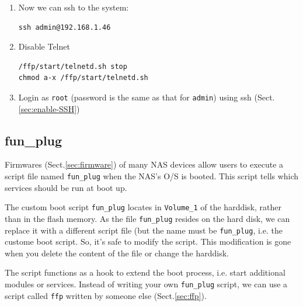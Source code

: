 \begin{enumerate}
 \item Now we can ssh to the system:
\begin{verbatim}
ssh admin@192.168.1.46
\end{verbatim}  
   
  \item Disable Telnet
\begin{verbatim}
/ffp/start/telnetd.sh stop
chmod a-x /ffp/start/telnetd.sh 
\end{verbatim}

  \item Login as \verb!root! (password is the same as that for \verb!admin!)
  using ssh (Sect.\ref{sec:enable-SSH})
  
\end{enumerate}


\subsection{fun\_plug}
\label{sec:fun_plug}

Firmwares (Sect.\ref{sec:firmware}) of many NAS devices allow users to execute a
script file named \verb!fun_plug! when the NAS's O/S is booted. This script
tells which services should be run at boot up.


The custom boot script \verb!fun_plug! locates in \verb!Volume_1! of the
harddisk, rather than in the flash memory. As the file \verb!fun_plug! resides
on the hard disk, we can replace it with a different script file (but the name
must be \verb!fun_plug!, i.e. the custome boot script. So, it's safe to modify
the script. This modification is gone when you delete the content of the file or
change the harddisk.

The script functions as a hook to extend the boot process, i.e. start additional
modules or services. Instead of writing your own \verb!fun_plug! script, we can
use a script called \verb!ffp! written by someone else (Sect.\ref{sec:ffp}). 

